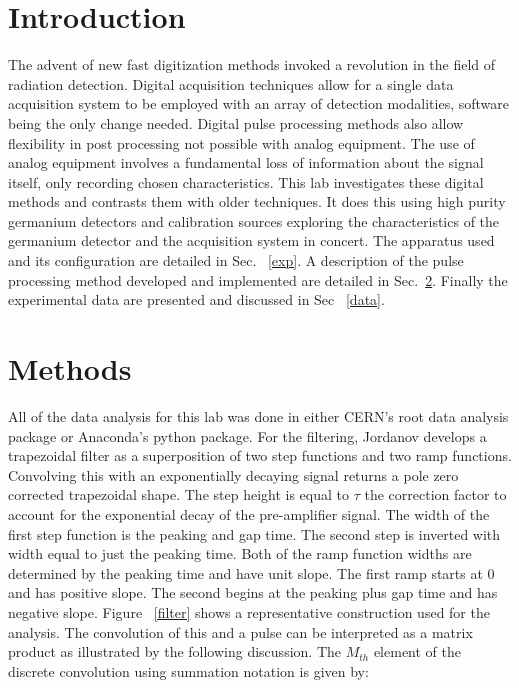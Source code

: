 \documentclass[twocolumn,preprintnumbers,superscriptaddress,amsmath,amssymb,floatfix]{revtex4-1}
\begin{document}
\section{Introduction}
\label{intro}
The advent of new fast digitization methods invoked a revolution in the field of radiation detection. Digital acquisition techniques allow for a single data acquisition system to be employed with an array of detection modalities, software being the only change needed. Digital pulse processing methods also allow flexibility in post processing not possible with analog equipment. The use of analog equipment involves a fundamental loss of information about the signal itself, only recording chosen characteristics. This lab investigates these digital methods and contrasts them with older techniques. It does this using high purity germanium detectors and calibration sources exploring the characteristics of the germanium detector and the acquisition system in concert. The apparatus used and its configuration are detailed in Sec. ~\ref{exp}. A description of the pulse processing method developed and implemented are detailed in Sec.~\ref{methods}. Finally the experimental data are presented and discussed in Sec ~\ref{data}. 
  

\section{Methods}
\label{methods}
All of the data analysis for this lab was done in either CERN's root data analysis package \cite{root} or Anaconda's python package\cite{python}. For the filtering, Jordanov develops a trapezoidal filter as a superposition of two step functions and two ramp functions. Convolving this with an exponentially decaying signal returns a pole zero corrected trapezoidal shape.\cite{jordanov_1} The step height is equal to $\tau$ the correction factor to account for the exponential decay of the pre-amplifier signal. The width of the first step function is the peaking and gap time. The second step  is inverted with width equal to just the peaking time. Both of the ramp function widths are determined by the peaking time and have unit slope. The first ramp starts at 0 and has positive slope.  The second begins at the peaking plus gap time and has negative slope. Figure ~\ref{filter} shows a representative construction used for the analysis. The convolution of this and a pulse can be interpreted as a matrix product as illustrated by the following discussion. The $M_{th}$ element of the discrete convolution using summation notation is given by:
\end{document}
